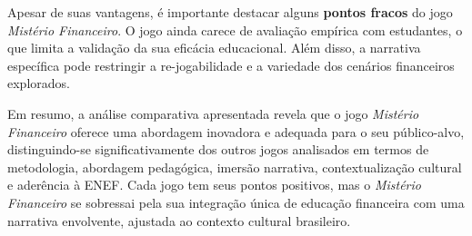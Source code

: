 Apesar de suas vantagens, é importante destacar alguns \textbf{pontos fracos} do jogo \textit{Mistério Financeiro}. O jogo ainda carece de avaliação empírica com estudantes, o que limita a validação da sua eficácia educacional. Além disso, a narrativa específica pode restringir a re-jogabilidade e a variedade dos cenários financeiros explorados.

Em resumo, a análise comparativa apresentada revela que o jogo \textit{Mistério Financeiro} oferece uma abordagem inovadora e adequada para o seu público-alvo, distinguindo-se significativamente dos outros jogos analisados em termos de metodologia, abordagem pedagógica, imersão narrativa, contextualização cultural e aderência à ENEF. Cada jogo tem seus pontos positivos, mas o \textit{Mistério Financeiro} se sobressai pela sua integração única de educação financeira com uma narrativa envolvente, ajustada ao contexto cultural brasileiro.